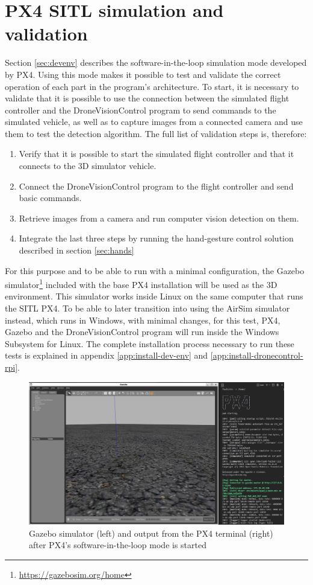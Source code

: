 \section{PX4 SITL simulation and validation}
\label{sec:test-2-sitl}

Section \ref{sec:devenv} describes the software-in-the-loop simulation mode developed by PX4.
Using this mode makes it possible to test and validate the correct operation of each part in the program's architecture.
To start, it is necessary to validate that it is possible to use the connection between the simulated flight controller and the DroneVisionControl program to send commands to the simulated vehicle, as well as to capture images from a connected camera and use them to test the detection algorithm.
The full list of validation steps is, therefore:
\begin{enumerate}
    \item Verify that it is possible to start the simulated flight controller and that it connects to the 3D simulator vehicle.
    \item Connect the DroneVisionControl program to the flight controller and send basic commands.
    \item Retrieve images from a camera and run computer vision detection on them.
    \item Integrate the last three steps by running the hand-gesture control solution described in section \ref{sec:hands}
\end{enumerate}

For this purpose and to be able to run with a minimal configuration, the Gazebo simulator\footnote{\url{https://gazebosim.org/home}} included with the base PX4 installation will be used as the 3D environment.
This simulator works inside Linux on the same computer that runs the SITL PX4.
To be able to later transition into using the AirSim simulator instead, which runs in Windows, with minimal changes, for this test, PX4, Gazebo and the DroneVisionControl program will run inside the Windows Subsystem for Linux.
The complete installation process necessary to run these tests is explained in appendix \ref{app:install-dev-env} and \ref{app:install-dronecontrol-rpi}.

\begin{figure}
  \centering
  \includegraphics[width=\textwidth, keepaspectratio]{img/gazebo.png}
  \caption{Gazebo simulator (left) and output from the PX4 terminal (right) after PX4's software-in-the-loop mode is started}\label{fig:gazebo}
\end{figure}

